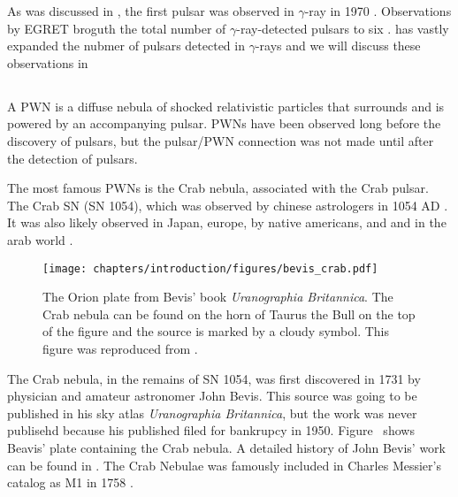 As was discussed in ,
the first pulsar was observed in $\gamma$-ray in 1970
\citep{kniffen_1970_study-gamma}.  Observations by \ac{EGRET}
broguth the total number of $\gamma$-ray-detected pulsars to six
\citep{nolan_1996a_egret-observations}.  \fermi has vastly expanded the
nubmer of pulsars detected in $\gamma$-rays and we will discuss these
observations in \subsecref{2pc}

\subsection{}

A \gls{PWN} is a diffuse nebula of shocked relativistic particles
that surrounds and is powered by an accompanying pulsar. 
\glspl{PWN} have been observed long before the discovery of pulsars, but
the pulsar/\gls{PWN} connection was not made until
after the detection of pulsars.

The most famous \glspl{PWN} is the Crab nebula, associated with the Crab
pulsar.  The Crab \ac{SN} (SN 1054), which was observed by chinese astrologers 
in 1054 AD \cite{hester_2008_nebula:-astrophysical}.
It was also likely observed in
Japan, europe, by native americans,
and and in the arab world 
\citep[see][and references therein]{collins_1999a_reinterpretation-historical}.

\begin{figure}[htbp]
  \centering
  \texttt{[image: chapters/introduction/figures/bevis\_crab.pdf]}
  \caption{The Orion plate from Bevis' book {\em Uranographia Britannica}.
  The Crab nebula can be found on the horn of Taurus the Bull 
  on the top of the figure and the source is marked by a 
  cloudy symbol.
  This figure was reproduced from \cite{ashworth_1981_bevis-uranographia}.}
\end{figure}

The Crab nebula, in the remains of SN 1054,
was first discovered in 1731 by physician and amateur astronomer
John Bevis.  This source was going to be published in his sky atlas
{\em Uranographia Britannica}, but the work was never publisehd because
his published filed for bankrupcy in 1950.  Figure~
shows Beavis' plate containing the Crab nebula.  A detailed history of
John Bevis' work can be found in \cite{ashworth_1981_bevis-uranographia}.
The Crab Nebulae was famously included in Charles Messier's catalog as
M1 in 1758 \cite{hester_2008_nebula:-astrophysical}.

